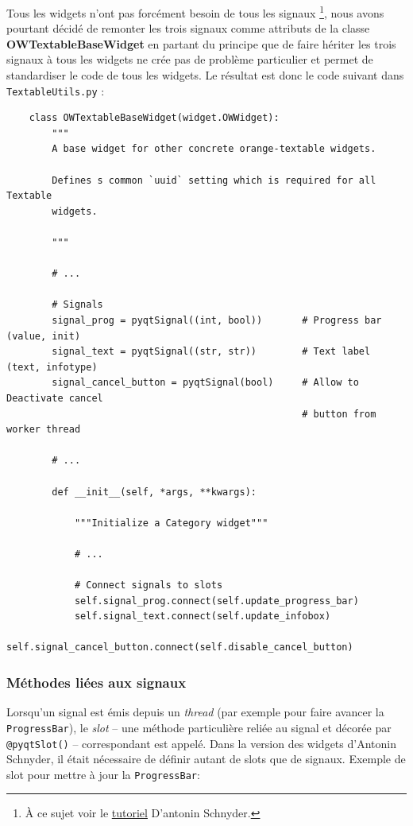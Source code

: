 \documentclass{article}
\begin{document}
Tous les widgets n'ont pas forcément besoin de tous les signaux \footnote{À ce sujet voir le \href{https://docs.google.com/document/d/1QtXm2aYMZXAyM7mfBTqxt_XrTNFqC7e3aqy7OC1A_18/edit}{tutoriel} D'antonin Schnyder.}, nous avons pourtant décidé de remonter les trois signaux comme attributs de la classe \textbf{OWTextableBaseWidget} en partant du principe que de faire hériter les trois signaux à tous les widgets ne crée pas de problème particulier et permet de standardiser le code de tous les widgets. 
\vspace{5mm}
Le résultat est donc le code suivant dans \texttt{TextableUtils.py} : 

\begin{verbatim}
    class OWTextableBaseWidget(widget.OWWidget):
        """
        A base widget for other concrete orange-textable widgets.
    
        Defines s common `uuid` setting which is required for all Textable
        widgets.
    
        """

        # ...

        # Signals
        signal_prog = pyqtSignal((int, bool))       # Progress bar (value, init)
        signal_text = pyqtSignal((str, str))        # Text label (text, infotype)
        signal_cancel_button = pyqtSignal(bool)     # Allow to Deactivate cancel
                                                    # button from worker thread

        # ...
        
        def __init__(self, *args, **kwargs):

            """Initialize a Category widget"""

            # ...

            # Connect signals to slots
            self.signal_prog.connect(self.update_progress_bar) 
            self.signal_text.connect(self.update_infobox)
            self.signal_cancel_button.connect(self.disable_cancel_button)
\end{verbatim}

\subsubsection{Méthodes liées aux signaux}

Lorsqu'un signal est émis depuis un \textit{thread} (par exemple pour faire avancer la \texttt{ProgressBar}),  le \textit{slot} – une méthode particulière reliée au signal et décorée par \texttt{@pyqtSlot()} – correspondant est appelé. Dans la version des widgets d'Antonin Schnyder, il était nécessaire de définir autant de slots que de signaux.
\newline
Exemple de slot pour mettre à jour la \texttt{ProgressBar}:
\end{document}
